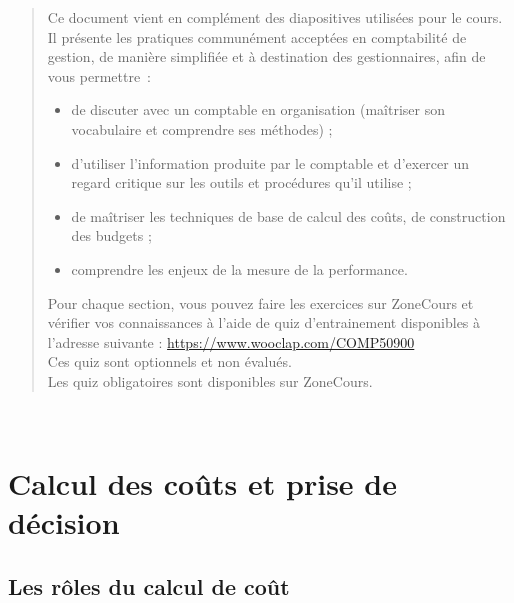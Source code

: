 \documentclass{tufte-handout}
\begin{document}
\begin{quote}
Ce document vient en complément des diapositives utilisées pour le cours. Il présente les pratiques communément acceptées en comptabilité de gestion, de manière simplifiée et à destination des gestionnaires, afin de vous permettre :\\
\begin{itemize}
\item de discuter avec un comptable en organisation (maîtriser son vocabulaire et comprendre ses méthodes) ;\\
\item d'utiliser l’information produite par le comptable et d'exercer un regard critique sur les outils et procédures qu’il utilise ;\\
\item de maîtriser les techniques de base de calcul des coûts, de construction des budgets ;\\
\item comprendre les enjeux de la mesure de la performance.\\
\end{itemize}

Pour chaque section, vous pouvez faire les exercices sur ZoneCours et vérifier vos connaissances à l'aide de quiz d’entrainement disponibles à l'adresse suivante : \url{https://www.wooclap.com/COMP50900} \\
Ces quiz sont optionnels et non évalués.\\
Les quiz obligatoires sont disponibles sur ZoneCours.\\
\end{quote}

\clearpage\\
\section{Calcul des coûts et prise de décision}
\label{sec:org32291cf}
\subsection{Les rôles du calcul de coût}
\label{sec:orgd7ca010}
\end{document}

